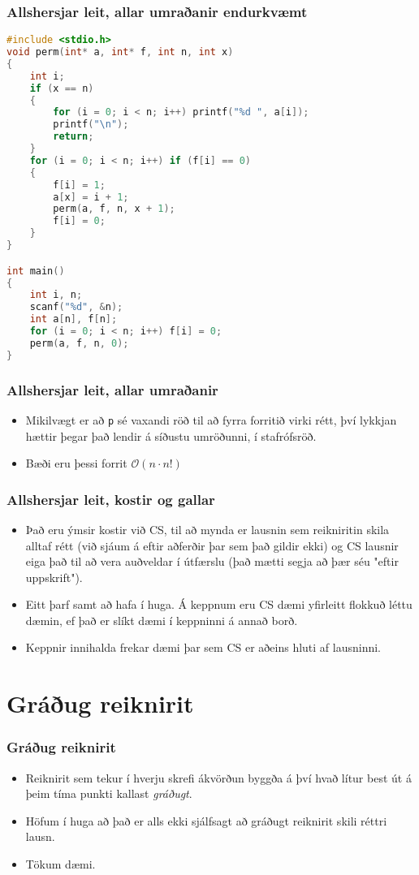 \documentclass{beamer}
\renewcommand\O{\mathcal{O}}
\begin{document}
\begin{frame}[fragile]
	\frametitle{Allshersjar leit, allar umraðanir endurkvæmt}
\tiny
\begin{lstlisting}[language=C]
#include <stdio.h>
void perm(int* a, int* f, int n, int x)
{
	int i;
	if (x == n)
	{
		for (i = 0; i < n; i++) printf("%d ", a[i]);
		printf("\n");
		return;
	}
	for (i = 0; i < n; i++) if (f[i] == 0)
	{
		f[i] = 1;
		a[x] = i + 1;
		perm(a, f, n, x + 1);
		f[i] = 0;
	}
}

int main()
{
	int i, n;
	scanf("%d", &n);
	int a[n], f[n];
	for (i = 0; i < n; i++) f[i] = 0;
	perm(a, f, n, 0);
}
\end{lstlisting}
\end{frame}

\begin{frame}
	\frametitle{Allshersjar leit, allar umraðanir}
\begin{itemize}
	\item<1-> Mikilvægt er að \texttt{p} sé vaxandi röð til að fyrra forritið virki rétt, því lykkjan hættir þegar það lendir á síðustu umröðunni,
		í stafrófsröð.
	\item<2-> Bæði eru þessi forrit $\O(n\cdot n!)$
\end{itemize}
\end{frame}

\begin{frame}
	\frametitle{Allshersjar leit, kostir og gallar}
\begin{itemize}
	\item<1-> Það eru ýmsir kostir við CS, til að mynda er lausnin sem reikniritin skila alltaf rétt (við sjáum á eftir aðferðir þar sem það gildir ekki)
		og CS lausnir eiga það til að vera auðveldar í útfærslu (það mætti segja að þær séu "eftir uppskrift").
	\item<2-> Eitt þarf samt að hafa í huga. Á keppnum eru CS dæmi yfirleitt flokkuð léttu dæmin, ef það er slíkt dæmi í keppninni á annað borð.
	\item<3-> Keppnir innihalda frekar dæmi þar sem CS er aðeins hluti af lausninni.
\end{itemize}
\end{frame}

\section{Gráðug reiknirit}

\begin{frame}
	\frametitle{Gráðug reiknirit}
\begin{itemize}
	\item<1-> Reiknirit sem tekur í hverju skrefi ákvörðun byggða á því hvað lítur best út á þeim tíma punkti kallast \emph{gráðugt}.
	\item<2-> Höfum í huga að það er alls ekki sjálfsagt að gráðugt reiknirit skili réttri lausn.
	\item<3-> Tökum dæmi.
\end{itemize}
\end{frame}
\end{document}
